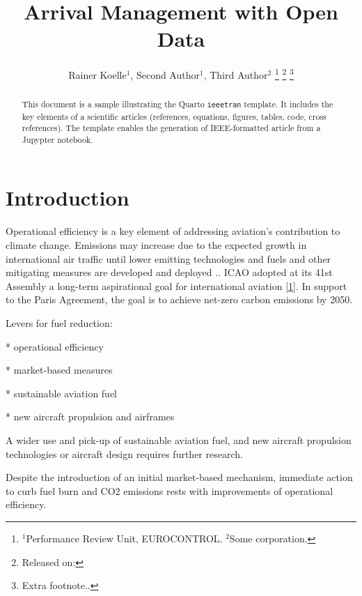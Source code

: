 \documentclass[letterpaper, 10 pt, journal, twoside]{IEEEtran}
\begin{document}
\author{
        Rainer Koelle\(^1\),     Second
Author\(^1\),     Third Author\(^2\)
    \thanks{\(^1\)Performance Review Unit, EUROCONTROL. \(^2\)Some
corporation.}
    \thanks{Released on: }
    \thanks{Extra footnote..}
}


\title{Arrival Management with Open Data}
\maketitle

\begin{abstract}
    This document is a sample illustrating the Quarto \texttt{ieeetran}
    template. It includes the key elements of a scientific articles
    (references, equations, figures, tables, code, cross references).
    The template enables the generation of IEEE-formatted article from a
    Jupypter notebook.
\end{abstract}

\hypertarget{introduction}{%
\section{Introduction}\label{introduction}}

Operational efficiency is a key element of addressing aviation's
contribution to climate change. Emissions may increase due to the
expected growth in international air traffic until lower emitting
technologies and fuels and other mitigating measures are developed and
deployed .. ICAO adopted at its 41st Assembly a long-term aspirational
goal for international aviation
\protect\hyperlink{ref-icao2022}{{[}1{]}}. In support to the Paris
Agreement, the goal is to achieve net-zero carbon emissions by 2050.

Levers for fuel reduction:

* operational efficiency

* market-based measures

* sustainable aviation fuel

* new aircraft propulsion and airframes

A wider use and pick-up of sustainable aviation fuel, and new aircraft
propulsion technologies or aircraft design requires further research.

Despite the introduction of an initial market-based mechanism, immediate
action to curb fuel burn and CO2 emissions rests with improvements of
operational efficiency.
\end{document}
